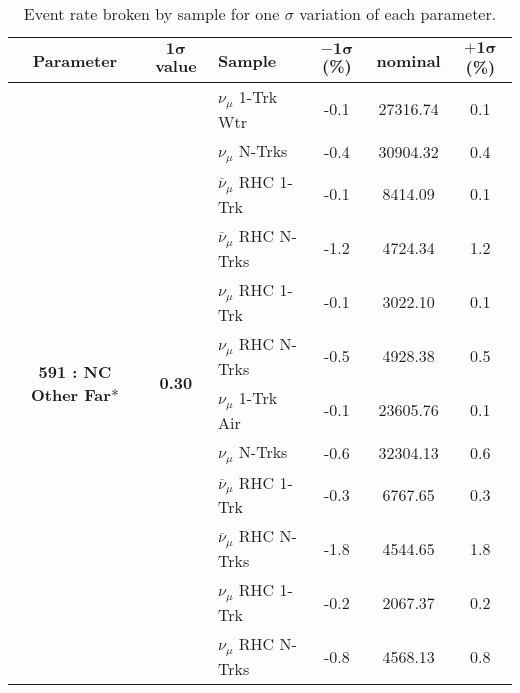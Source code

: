 \begin{table}[ht!]
\centering
\begin{tabular}{ c  c  l  c  c  c }
\midrule[1.3pt]
\textbf{Parameter} & \textbf{$\mathbf{1\sigma}$ value} & \textbf{Sample} & \textbf{$\mathbf{-1\sigma}$ (\%)}  &  \textbf{nominal}  &  \textbf{$\mathbf{+1\sigma}$ (\%)} \\
\midrule[1.3pt]
\multirow{12}{*}{\textbf{591 : NC Other Far}*} & \multirow{12}{*}{\textbf{0.30}} & $\nu_\mu$ 1-Trk Wtr &   -0.1 &  27316.74 &   0.1 \\ 
 &  & $\nu_\mu$ N-Trks &   -0.4 &  30904.32 &   0.4 \\ 
 &  & $\overline{\nu}_\mu$ RHC 1-Trk &   -0.1 &  8414.09 &   0.1 \\ 
 &  & $\overline{\nu}_\mu$ RHC N-Trks &   -1.2 &  4724.34 &   1.2 \\ 
 &  & $\nu_\mu$ RHC 1-Trk &   -0.1 &  3022.10 &   0.1 \\ 
 &  & $\nu_\mu$ RHC N-Trks &   -0.5 &  4928.38 &   0.5 \\ 
 &  & $\nu_\mu$ 1-Trk Air &   -0.1 &  23605.76 &   0.1 \\ 
 &  & $\nu_\mu$ N-Trks &   -0.6 &  32304.13 &   0.6 \\ 
 &  & $\overline{\nu}_\mu$ RHC 1-Trk &   -0.3 &  6767.65 &   0.3 \\ 
 &  & $\overline{\nu}_\mu$ RHC N-Trks &   -1.8 &  4544.65 &   1.8 \\ 
 &  & $\nu_\mu$ RHC 1-Trk &   -0.2 &  2067.37 &   0.2 \\ 
 &  & $\nu_\mu$ RHC N-Trks &   -0.8 &  4568.13 &   0.8 \\ 
\midrule[1.3pt]
\end{tabular}
\centering
\caption{Event rate broken by sample for one $\sigma$ variation of each parameter.}
\end{table}
\addtocounter{table}{-1}
